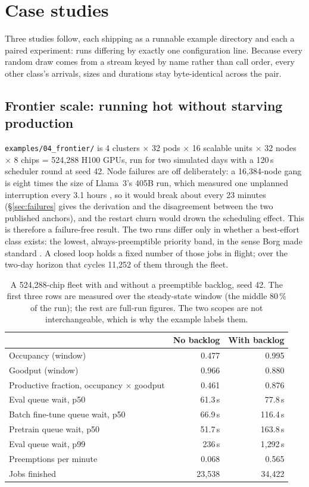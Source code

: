 \section{Case studies}\label{sec:cases}

Three studies follow, each shipping as a runnable example directory and each a
paired experiment: runs differing by exactly one configuration line. Because
every random draw comes from a stream keyed by name rather than call order,
every other class's arrivals, sizes and durations stay byte-identical across
the pair.

\subsection{Frontier scale: running hot without starving
production}\label{sec:case-frontier}

\texttt{examples/04\_frontier/} is 4 clusters $\times$ 32 pods $\times$ 16
scalable units $\times$ 32 nodes $\times$ 8 chips = 524,288 H100 GPUs, run for
two simulated days with a 120\,s scheduler round at seed 42. Node failures are
off deliberately: a 16,384-node gang is eight times the size of Llama~3's 405B
run, which measured one unplanned interruption every 3.1 hours \cite{llama3}, so
it would break about every 23 minutes (\S\ref{sec:failures} gives the
derivation and the disagreement between the two published anchors), and the
restart churn would drown the scheduling effect. This is therefore a
failure-free result. The two runs differ only in whether a best-effort class
exists: the lowest, always-preemptible priority band, in the sense Borg made
standard \cite{borg2015}. A closed loop holds a fixed number of those jobs in
flight; over the two-day horizon that cycles 11,252 of them through the fleet.

\begin{table}[t]
\centering
\begin{tabular}{lrr}
\toprule
 & No backlog & With backlog \\
\midrule
Occupancy (window) & 0.477 & 0.995 \\
Goodput (window) & 0.966 & 0.880 \\
Productive fraction, occupancy $\times$ goodput & 0.461 & 0.876 \\
\midrule
Eval queue wait, p50 & 61.3\,s & 77.8\,s \\
Batch fine-tune queue wait, p50 & 66.9\,s & 116.4\,s \\
Pretrain queue wait, p50 & 51.7\,s & 163.8\,s \\
Eval queue wait, p99 & 236\,s & 1{,}292\,s \\
Preemptions per minute & 0.068 & 0.565 \\
Jobs finished & 23{,}538 & 34{,}422 \\
\bottomrule
\end{tabular}
\caption{A 524,288-chip fleet with and without a preemptible backlog, seed 42.
The first three rows are measured over the steady-state window (the middle
80\,\% of the run); the rest are full-run figures. The two scopes are not
interchangeable, which is why the example labels them.}
\label{tab:frontier}
\end{table}

